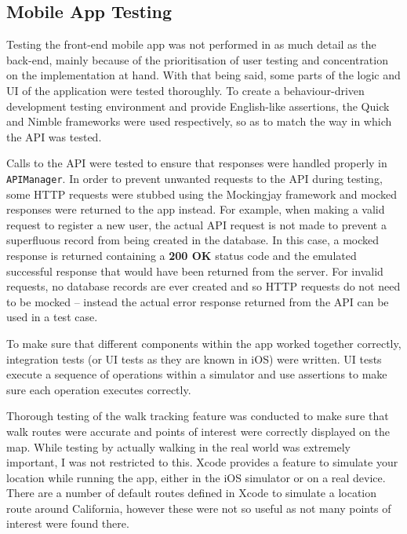 \subsection{Mobile App Testing}

Testing the front-end mobile app was not performed in as much detail as the back-end, mainly because of the prioritisation of user testing and concentration on the implementation at hand. With that being said, some parts of the logic and UI of the application were tested thoroughly. To create a behaviour-driven development testing environment and provide English-like assertions, the Quick and Nimble frameworks were used respectively, so as to match the way in which the API was tested.

Calls to the API were tested to ensure that responses were handled properly in \verb|APIManager|. In order to prevent unwanted requests to the API during testing, some HTTP requests were stubbed using the Mockingjay framework and mocked responses were returned to the app instead. For example, when making a valid request to register a new user, the actual API request is not made to prevent a superfluous record from being created in the database. In this case, a mocked response is returned containing a \textbf{200 OK} status code and the emulated successful response that would have been returned from the server. For invalid requests, no database records are ever created and so HTTP requests do not need to be mocked -- instead the actual error response returned from the API can be used in a test case.

To make sure that different components within the app worked together correctly, integration tests (or UI tests as they are known in iOS) were written. UI tests execute a sequence of operations within a simulator and use assertions to make sure each operation executes correctly.



Thorough testing of the walk tracking feature was conducted to make sure that walk routes were accurate and points of interest were correctly displayed on the map. While testing by actually walking in the real world was extremely important, I was not restricted to this. Xcode provides a feature to simulate your location while running the app, either in the iOS simulator or on a real device. There are a number of default routes defined in Xcode to simulate a location route around California, however these were not so useful as not many points of interest were found there.

